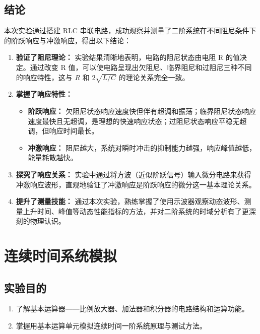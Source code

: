 \documentclass[12pt, a4paper]{ctexrep}
\begin{document}
\section{结论}
本次实验通过搭建 RLC 串联电路，成功观察并测量了二阶系统在不同阻尼条件下的阶跃响应与冲激响应，得出以下结论：

\begin{enumerate}
    \item \textbf{验证了阻尼理论：} 实验结果清晰地表明，电路的阻尼状态由电阻 R 的值决定。通过改变 R 值，可以使电路呈现出欠阻尼、临界阻尼和过阻尼三种不同的响应特性，这与 $R$ 和 $2\sqrt{L/C}$ 的理论关系完全一致。

    \item \textbf{掌握了响应特性：}
    \begin{itemize}
        \item \textbf{阶跃响应：} 欠阻尼状态响应速度快但伴有超调和振荡；临界阻尼状态响应速度最快且无超调，是理想的快速响应状态；过阻尼状态响应平稳无超调，但响应时间最长。
        \item \textbf{冲激响应：} 阻尼越大，系统对瞬时冲击的抑制能力越强，响应峰值越低，能量耗散越快。
    \end{itemize}

    \item \textbf{探究了响应关系：} 实验中通过将方波（近似阶跃信号）输入微分电路来获得冲激响应波形，直观地验证了冲激响应是阶跃响应的微分这一基本理论关系。

    \item \textbf{提升了测量技能：} 通过本次实验，熟练掌握了使用示波器观察动态波形、测量上升时间、峰值等动态性能指标的方法，并对二阶系统的时域分析有了更深刻的物理认识。
\end{enumerate}

\chapter{连续时间系统模拟}

\section{实验目的}
\begin{enumerate}
    \item 了解基本运算器——比例放大器、加法器和积分器的电路结构和运算功能。
    \item 掌握用基本运算单元模拟连续时间一阶系统原理与测试方法。
\end{enumerate}
\end{document}
